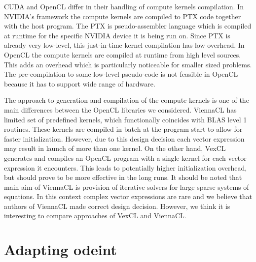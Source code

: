 \documentclass[1p]{elsarticle}
\begin{document}
CUDA and OpenCL differ in their handling of compute kernels compilation. In
NVIDIA's framework the compute kernels are compiled to PTX code together with
the host program. The PTX is pseudo-assembler language which is compiled at
runtime for the specific NVIDIA device it is being run on. Since PTX is already
very low-level, this just-in-time kernel compilation has low overhead. In
OpenCL the compute kernels are compiled at runtime from high level sources.
This adds an overhead which is particularly noticeable for smaller sized
problems. The pre-compilation to some low-level pseudo-code is not feasible in
OpenCL because it has to support wide range of hardware.

The approach to generation and compilation of the compute kernels is one of the
main differences between the OpenCL libraries we considered.  ViennaCL has
limited set of predefined kernels, which functionally coincides with BLAS level
1 routines.  These kernels are compiled in batch at the program start to allow
for faster initialization. However, due to this design decision each vector
expression may result in launch of more than one kernel.  On the other hand,
VexCL generates and compiles an OpenCL program with a single kernel for each
vector expression it encounters.  This leads to potentially higher
initialization overhead, but should prove to be more effective in the long
runs. It should be noted that main aim of ViennaCL is provision of iterative
solvers for large sparse systems of equations. In this context complex vector
expressions are rare and we believe that authors of ViennaCL made correct
design decision.  However, we think it is interesting to compare approaches of
VexCL and ViennaCL.






%
%
\section{Adapting odeint}
\end{document}
